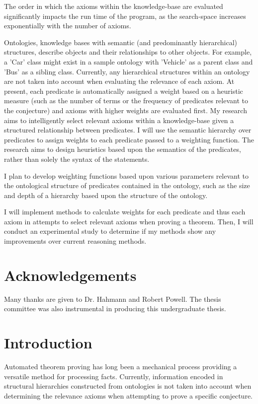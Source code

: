 \documentclass{article}
\begin{document}
The order in which the axioms within the knowledge-base are evaluated significantly impacts the run time of the program, as the search-space increases exponentially with the number of axioms. 

Ontologies, knowledge bases with semantic (and predominantly hierarchical) structures, describe objects and their relationships to other objects. For example, a 'Car' class might exist in a sample ontology with 'Vehicle' as a parent class and 'Bus' as a sibling class. Currently, any hierarchical structures within an ontology are not taken into account when evaluating the relevance of each axiom. At present, each predicate is automatically assigned a weight based on a heuristic measure (such as the number of terms or the frequency of predicates relevant to the conjecture) and axioms with higher weights are evaluated first. My research aims to intelligently select relevant axioms within a knowledge-base given a structured relationship between predicates. I will use the semantic hierarchy over predicates to assign weights to each predicate passed to a weighting function. The research aims to design heuristics based upon the semantics of the predicates, rather than solely the syntax of the statements. 

I plan to develop weighting functions based upon various parameters relevant to the ontological structure of predicates contained in the ontology, such as the size and depth of a hierarchy based upon the structure of the ontology. 

I will implement methods to calculate weights for each predicate and thus each axiom in attempts to select relevant axioms when proving a theorem. Then, I will conduct an experimental study to determine if my methods show any improvements over current reasoning methods.
	
	\setcounter{page}{3}
        \newpage
        \section*{Acknowledgements}
Many thanks are given to Dr. Hahmann and Robert Powell. The thesis committee was also instrumental in producing this undergraduate thesis.

	\newpage
	\tableofcontents

	
	




	\newpage
	\setcounter{page}{1}
	\section{Introduction}
Automated theorem proving has long been a mechanical process providing a versatile method for processing facts. Currently, information encoded in structural hierarchies constructed from ontologies is not taken into account when determining the relevance axioms when attempting to prove a specific conjecture.  
\end{document}

